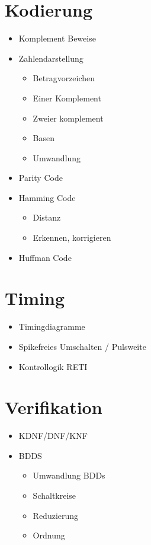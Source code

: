 \documentclass{scrartcl}[9pt, a4paper]
\begin{document}
\section*{Kodierung}

\begin{itemize}
	\item Komplement Beweise
	\item Zahlendarstellung
	      \begin{itemize}
	      	\item Betragvorzeichen
	      	\item Einer Komplement
	      	\item Zweier komplement
	      	\item Basen
	      	\item Umwandlung
	      \end{itemize}
	\item Parity Code
	\item Hamming Code
	      \begin{itemize}
	      	\item Distanz
	      	\item Erkennen, korrigieren
	      \end{itemize}
	\item Huffman Code
\end{itemize}

\section*{Timing}

\begin{itemize}
	\item Timingdiagramme
	\item Spikefreies Umschalten / Pulsweite
	\item Kontrollogik RETI
\end{itemize}

\section*{Verifikation}

\begin{itemize}
	\item KDNF/DNF/KNF
	\item BDDS
	      \begin{itemize}
	      	\item Umwandlung BDDs \item Schaltkreise
	      	\item Reduzierung
	      	\item Ordnung
	      \end{itemize}
\end{itemize}
\end{document}
